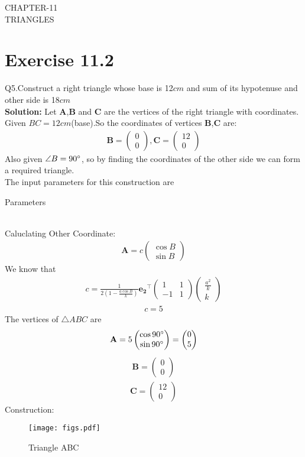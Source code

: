 \documentclass{article}
\newcommand{\myvec}[1]{\ensuremath{\begin{pmatrix}#1\end{pmatrix}}}
\let\vec\mathbf
\begin{document}
\begin{center}
        \textbf\large{CHAPTER-11 \\ TRIANGLES}
\end{center}
\section{Exercise 11.2}
Q5.Construct a right triangle whose base is 12$cm$ and sum of its hypotenuse and other side is 18$cm$ \\
\textbf{Solution:}
Let $\vec{A}$,$\vec{B}$ and $\vec{C}$ are the vertices of the right triangle with coordinates.
Given $BC=12cm$(base).So the coordinates of vertices $\vec{B}$,$\vec{C}$ are:
\begin{align}
{
\vec{B} =\myvec{0\\0},\vec{C} =\myvec{12\\0}
}
\end{align}
Also given $\angle{B}=90\degree$, so by finding the coordinates of the other side we can form a required triangle. \\
 The input parameters for this construction are
 \begin{table}[h]
   \centering
   
   \caption{Parameters}
   \label{tab:Table1}
\end{table}\\
Caluclating Other Coordinate:
  \begin{align}
	  \vec{A} = c\myvec{\cos{B} \\ \sin{B}}
   \end{align}
We know that\\
\begin{align}  
	c = \frac{1}{2(1-\frac{a\cos{B}}{k})}\vec{e_2}^{\top}\myvec{1 & 1\\-1 & 1}\myvec{\frac{a^2}{k}\\k}
     \end{align}
  \begin{align}
	  c = 5
  \end{align}  
The vertices of $\triangle ABC$ are \\
\begin{align}
\vec{A} = 5\myvec{\cos 90\degree\\\sin 90\degree}
  = \myvec{0\\5}
\end{align}
\begin{align}
 \vec{B} = \myvec{0\\0}
\end{align}
\begin{align}
 \vec{C} = \myvec{12\\0}
 \end{align}        
Construction: 
\begin{figure}[h]
 \begin{center}
  \texttt{[image: figs.pdf]}
 \end{center}
 \caption{Triangle ABC}
 \label{fig:Fig1}
\end{figure}
\end{document}

